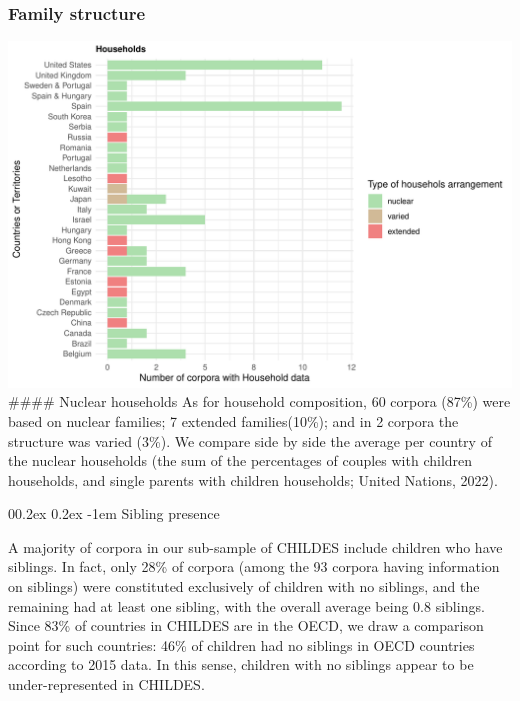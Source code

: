 \documentclass[
  man,floatsintext]{apa6}
\makeatletter
\let\oldparagraph\paragraph
\renewcommand{\paragraph}[1]{\oldparagraph{#1}\mbox{}}
\renewcommand{\paragraph}{\@startsection{paragraph}{4}{\parindent}%
  {0\baselineskip \@plus 0.2ex \@minus 0.2ex}%
  {-1em}%
  {\normalfont\normalsize\bfseries\itshape\typesectitle}}
\makeatother
\begin{document}
\hypertarget{family-structure-1}{%
\subsubsection{Family structure}\label{family-structure-1}}

\includegraphics{CHILDES_short_files/figure-latex/figure5-1.pdf}
\#\#\#\# Nuclear households
As for household composition, 60 corpora (87\%) were based on nuclear families; 7 extended families(10\%); and in 2 corpora the structure was varied (3\%). We compare side by side the average per country of the nuclear households (the sum of the percentages of couples with children households, and single parents with children households; United Nations, 2022).

\hypertarget{sibling-presence}{%
\paragraph{Sibling presence}\label{sibling-presence}}

A majority of corpora in our sub-sample of CHILDES include children who have siblings. In fact, only 28\% of corpora (among the 93 corpora having information on siblings) were constituted exclusively of children with no siblings, and the remaining had at least one sibling, with the overall average being 0.8 siblings. Since 83\% of countries in CHILDES are in the OECD, we draw a comparison point for such countries: 46\% of children had no siblings in OECD countries according to 2015 data. In this sense, children with no siblings appear to be under-represented in CHILDES.
\end{document}
